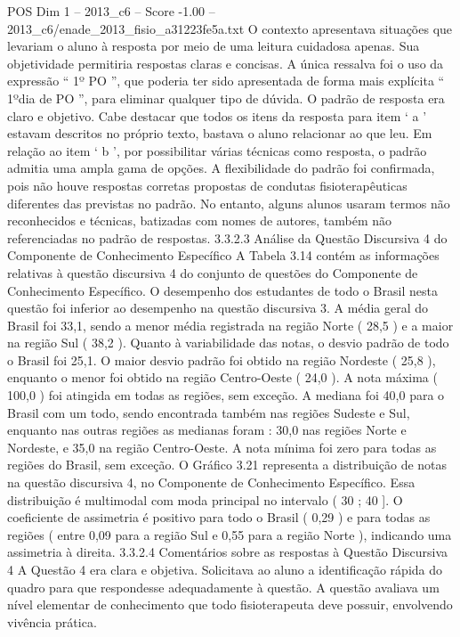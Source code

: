 \begin{textsample}{POS Dim 1 – 2013\_c6 – Score -1.00 – 2013\_c6/enade\_2013\_fisio\_a31223fe5a.txt}
O contexto apresentava situações que levariam o aluno à resposta por meio de uma leitura cuidadosa apenas.
Sua objetividade permitiria respostas claras e concisas.
A única ressalva foi o uso da expressão “ 1º PO ”, que poderia ter sido apresentada de forma mais explícita “ 1ºdia de PO ”, para eliminar qualquer tipo de dúvida.
O padrão de resposta era claro e objetivo.
Cabe destacar que todos os itens da resposta para item ‘ a ’ estavam descritos no próprio texto, bastava o aluno relacionar ao que leu.
Em relação ao item ‘ b ’, por possibilitar várias técnicas como resposta, o padrão admitia uma ampla gama de opções.
A flexibilidade do padrão foi confirmada, pois não houve respostas corretas propostas de condutas fisioterapêuticas diferentes das previstas no padrão.
No entanto, alguns alunos usaram termos não reconhecidos e técnicas, batizadas com nomes de autores, também não referenciadas no padrão de respostas. 3.3.2.3 Análise da Questão Discursiva 4 do Componente de Conhecimento Específico A Tabela 3.14 contém as informações relativas à questão discursiva 4 do conjunto de questões do Componente de Conhecimento Específico.
O desempenho dos estudantes de todo o Brasil nesta questão foi inferior ao desempenho na questão discursiva 3.
A média geral do Brasil foi 33,1, sendo a menor média registrada na região Norte ( 28,5 ) e a maior na região Sul ( 38,2 ).
Quanto à variabilidade das notas, o desvio padrão de todo o Brasil foi 25,1.
O maior desvio padrão foi obtido na região Nordeste ( 25,8 ), enquanto o menor foi obtido na região Centro-Oeste ( 24,0 ).
A nota máxima ( 100,0 ) foi atingida em todas as regiões, sem exceção.
A mediana foi 40,0 para o Brasil com um todo, sendo encontrada também nas regiões Sudeste e Sul, enquanto nas outras regiões as medianas foram : 30,0 nas regiões Norte e Nordeste, e 35,0 na região Centro-Oeste.
A nota mínima foi zero para todas as regiões do Brasil, sem exceção.
O Gráfico 3.21 representa a distribuição de notas na questão discursiva 4, no Componente de Conhecimento Específico.
Essa distribuição é multimodal com moda principal no intervalo ( 30 ; 40 ].
O coeficiente de assimetria é positivo para todo o Brasil ( 0,29 ) e para todas as regiões ( entre 0,09 para a região Sul e 0,55 para a região Norte ), indicando uma assimetria à direita. 3.3.2.4 Comentários sobre as respostas à Questão Discursiva 4 A Questão 4 era clara e objetiva.
Solicitava ao aluno a identificação rápida do quadro para que respondesse adequadamente à questão.
A questão avaliava um nível elementar de conhecimento que todo fisioterapeuta deve possuir, envolvendo vivência prática.

\end{textsample}
